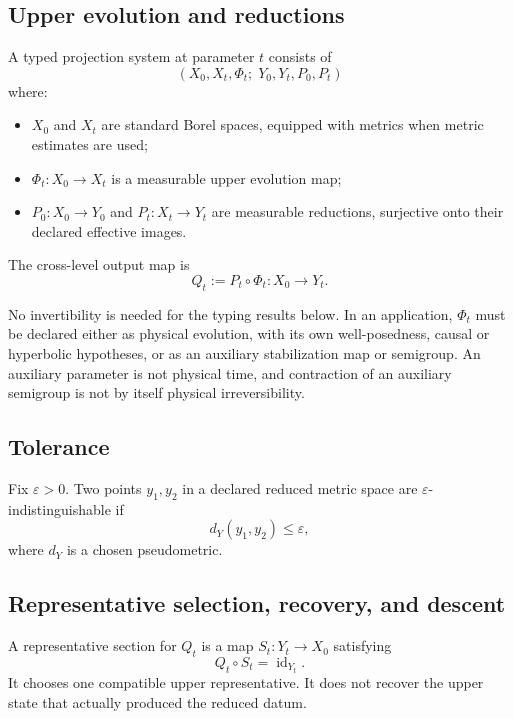 \documentclass[11pt]{article}
\theoremstyle{plain}
\theoremstyle{plain}
\begin{document}
\subsection{Upper evolution and reductions}

\begin{definition}
A typed projection system at parameter $t$ consists of
\[
(X_0,X_t,\Phi_t;\;Y_0,Y_t,P_0,P_t)
\]
where:
\begin{itemize}
\item $X_0$ and $X_t$ are standard Borel spaces, equipped with metrics when
metric estimates are used;
\item $\Phi_t:X_0\to X_t$ is a measurable upper evolution map;
\item $P_0:X_0\to Y_0$ and $P_t:X_t\to Y_t$ are measurable reductions,
surjective onto their declared effective images.
\end{itemize}
The cross-level output map is
\[
Q_t:=P_t\circ\Phi_t:X_0\longrightarrow Y_t.
\]
\end{definition}

\begin{remark}
No invertibility is needed for the typing results below.  In an application,
$\Phi_t$ must be declared either as physical evolution, with its own
well-posedness, causal or hyperbolic hypotheses, or as an auxiliary
stabilization map or semigroup.  An auxiliary parameter is not physical time,
and contraction of an auxiliary semigroup is not by itself physical
irreversibility.
\end{remark}

\subsection{Tolerance}

\begin{definition}[Tolerance]
Fix $\varepsilon>0$.
Two points $y_1,y_2$ in a declared reduced metric space are
$\varepsilon$-indistinguishable if
\[
d_Y(y_1,y_2)\le \varepsilon,
\]
where $d_Y$ is a chosen pseudometric.
\end{definition}

\subsection{Representative selection, recovery, and descent}

\begin{definition}
A representative section for $Q_t$ is a map $S_t:Y_t\to X_0$ satisfying
\[
Q_t\circ S_t=\operatorname{id}_{Y_t}.
\]
It chooses one compatible upper representative.  It does not recover the
upper state that actually produced the reduced datum.
\end{definition}
\end{document}
